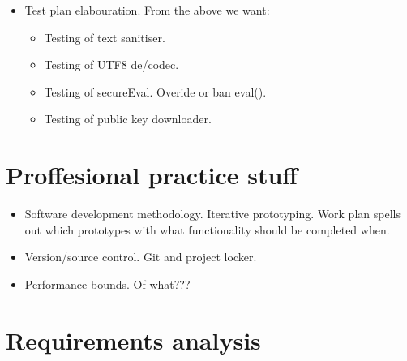 \begin{itemize}
\begin{itemize}
            \end{itemize}
            \item Test plan elabouration. From the above we want:
            \begin{itemize}
                \item Testing of text sanitiser.
                \item Testing of UTF8 de/codec.
                \item Testing of secureEval. Overide or ban eval().
                \item Testing of public key downloader.
            \end{itemize}
        \end{itemize}
    
    
\section{Proffesional practice stuff}
    \begin{itemize}
	\item Software development methodology. Iterative prototyping. Work plan spells out which prototypes with what functionality should be completed when.
	\item Version/source control. Git and project locker.
	\item Performance bounds. Of what???
    \end{itemize}
    
\section{Requirements analysis}
        
